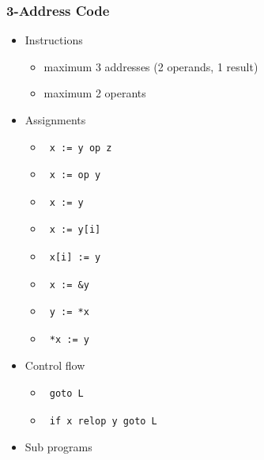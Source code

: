 \subsubsection{3-Address Code}
\begin{itemize}
	\item Instructions
\begin{itemize}
	\item maximum 3 addresses (2 operands, 1 result)
	\item maximum 2 operants
\end{itemize}
\item Assignments
\begin{itemize}
	\item \begin{verbatim} x := y op z\end{verbatim}
	\item \begin{verbatim} x := op y\end{verbatim}
	\item \begin{verbatim} x := y\end{verbatim}
	\item \begin{verbatim} x := y[i]\end{verbatim}
	\item \begin{verbatim} x[i] := y\end{verbatim}
	\item \begin{verbatim} x := &y\end{verbatim}
	\item \begin{verbatim} y := *x\end{verbatim}
	\item \begin{verbatim} *x := y\end{verbatim}
\end{itemize}
\item Control flow
\begin{itemize}
	\item \begin{verbatim} goto L\end{verbatim} 
	\item \begin{verbatim} if x relop y goto L	\end{verbatim}
\end{itemize}
\item Sub programs

\end{itemize}
